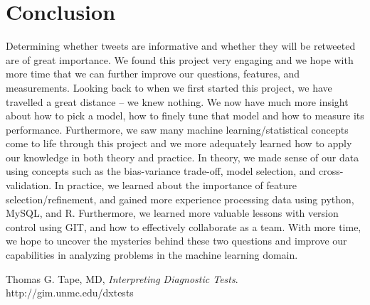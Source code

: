 \documentclass[12pt]{article}
\begin{document}
\section{Conclusion}
Determining whether tweets are informative and whether they will be retweeted are of great importance. We found this project very engaging and we hope with more time that we can further improve our questions, features, and measurements.  Looking back to when we first started this project, we have travelled a great distance -- we knew nothing. We now have much more insight about how to pick a model, how to finely tune that model and how to measure its performance. Furthermore, we saw many machine learning/statistical concepts come to life through this project and we more adequately learned how to apply our knowledge in both theory and practice. In theory, we made sense of our data using concepts such as the bias-variance trade-off, model selection, and cross-validation. In practice, we learned about the importance of feature selection/refinement, and gained more experience processing data using python, MySQL, and R. Furthermore, we learned more valuable lessons with version control using GIT, and how to effectively collaborate as a team. With more time, we hope to uncover the mysteries behind these two questions and improve our capabilities in analyzing problems in the machine learning domain.
\begin{thebibliography}{4}
    Thomas G. Tape, MD,
    \emph{Interpreting Diagnostic Tests}. 
    http://gim.unmc.edu/dxtests
\end{thebibliography}
\end{document}
